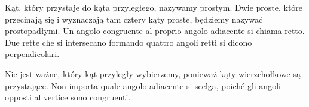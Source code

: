 \begin{definition}
    Kąt, który przystaje do kąta przyległego, nazywamy prostym. %
    Dwie proste, które przecinają się i wyznaczają tam cztery kąty proste, będziemy nazywać prostopadłymi. %
    Un angolo congruente al proprio angolo adiacente si chiama retto. %
    Due rette che si intersecano formando quattro angoli retti si dicono perpendicolari. %
\end{definition}

Nie jest ważne, który kąt przyległy wybierzemy, ponieważ kąty wierzchołkowe są przystające. %
Non importa quale angolo adiacente si scelga, poiché gli angoli opposti al vertice sono congruenti. %

%